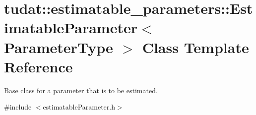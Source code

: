 \hypertarget{classtudat_1_1estimatable__parameters_1_1EstimatableParameter}{}\section{tudat\+:\+:estimatable\+\_\+parameters\+:\+:Estimatable\+Parameter$<$ Parameter\+Type $>$ Class Template Reference}
\label{classtudat_1_1estimatable__parameters_1_1EstimatableParameter}


Base class for a parameter that is to be estimated.  




{\ttfamily \#include $<$estimatable\+Parameter.\+h$>$}

